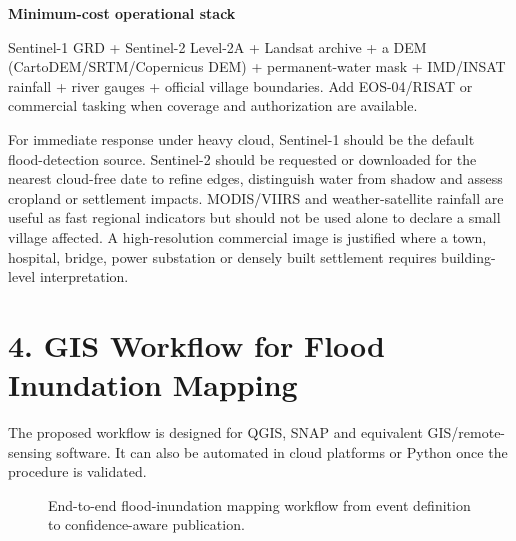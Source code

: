 \documentclass[11pt,a4paper]{article}
\begin{document}
\begin{summarybox}
{\sffamily\bfseries\color{Primary}Minimum-cost operational stack}\par
Sentinel-1 GRD + Sentinel-2 Level-2A + Landsat archive + a DEM (CartoDEM/SRTM/Copernicus DEM) + permanent-water mask + IMD/INSAT rainfall + river gauges + official village boundaries. Add EOS-04/RISAT or commercial tasking when coverage and authorization are available.
\end{summarybox}

For immediate response under heavy cloud, Sentinel-1 should be the default flood-detection source. Sentinel-2 should be requested or downloaded for the nearest cloud-free date to refine edges, distinguish water from shadow and assess cropland or settlement impacts. MODIS/VIIRS and weather-satellite rainfall are useful as fast regional indicators but should not be used alone to declare a small village affected. A high-resolution commercial image is justified where a town, hospital, bridge, power substation or densely built settlement requires building-level interpretation.

\section{4. GIS Workflow for Flood Inundation Mapping}\label{gis-workflow-for-flood-inundation-mapping}

The proposed workflow is designed for QGIS, SNAP and equivalent GIS/remote-sensing software. It can also be automated in cloud platforms or Python once the procedure is validated.

\begin{figure}[H]
\centering
{}
\caption{End-to-end flood-inundation mapping workflow from event definition to confidence-aware publication.}
\label{fig:flood-mapping-workflow}
\end{figure}
\end{document}
